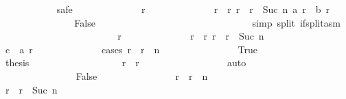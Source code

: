 \begin{isabellebody}
\ \ \ \ \ \ \ \ \ \ \isamarkupfalse%
\ safe\isanewline
\ \ \ \ \ \ \ \ \ \ \ \ \isamarkupfalse%
\ r\isanewline
\ \ \ \ \ \ \ \ \ \ \ \ \isamarkupfalse%
\ {\isachardoublequoteopen}r{}\ {\isacharless}\ r{\isachardoublequoteclose}\ {\isachardoublequoteopen}r\ {\isacharless}\ r{}\ {\isacharplus}\ Suc\ n{\isachardoublequoteclose}\ {\isachardoublequoteopen}{\isacharquery}a\ r\ {\isacharequal}\ {\isacharquery}b\ r{\isachardoublequoteclose}\isanewline
\ \ \ \ \ \ \ \ \ \ \ \ \isamarkupfalse%
\ \isamarkupfalse%
\ False\isanewline
\ \ \ \ \ \ \ \ \ \ \ \ \ \ \isamarkupfalse%
\ {\isacharasterisk}\isanewline
\ \ \ \ \ \ \ \ \ \ \ \ \ \ \isamarkupfalse%
\ {\isacharparenleft}simp\ split{\isacharcolon}\ if{\isacharunderscore}split{\isacharunderscore}asm{\isacharparenright}\isanewline
\ \ \ \ \ \ \ \ \ \ \isamarkupfalse%
\isanewline
\ \ \ \ \ \ \ \ \ \ \ \ \isamarkupfalse%
\ r\isanewline
\ \ \ \ \ \ \ \ \ \ \ \ \isamarkupfalse%
\ {\isachardoublequoteopen}r{}\ {\isacharless}\ r{\isachardoublequoteclose}\ {\isachardoublequoteopen}r\ {\isacharless}\ r{}\ {\isacharplus}\ Suc\ n{\isachardoublequoteclose}\isanewline
\ \ \ \ \ \ \ \ \ \ \ \ \isamarkupfalse%
\ {\isachardoublequoteopen}c{}\ {\isasymle}\ {\isacharquery}a\ r{\isachardoublequoteclose}\isanewline
\ \ \ \ \ \ \ \ \ \ \ \ \isamarkupfalse%
\ {\isacharparenleft}cases\ {\isachardoublequoteopen}r\ {\isacharless}\ r{}\ {\isacharplus}\ n{\isachardoublequoteclose}{\isacharparenright}\isanewline
\ \ \ \ \ \ \ \ \ \ \ \ \ \ \isamarkupfalse%
\ True\isanewline
\ \ \ \ \ \ \ \ \ \ \ \ \ \ \isamarkupfalse%
\ {\isacharquery}thesis\isanewline
\ \ \ \ \ \ \ \ \ \ \ \ \ \ \ \ \isamarkupfalse%
\ {\isacharasterisk}\ {\isacharbackquoteopen}r{}\ {\isacharless}\ r{\isacharbackquoteclose}\isanewline
\ \ \ \ \ \ \ \ \ \ \ \ \ \ \ \ \isamarkupfalse%
\ auto\isanewline
\ \ \ \ \ \ \ \ \ \ \ \ \isamarkupfalse%
\isanewline
\ \ \ \ \ \ \ \ \ \ \ \ \ \ \isamarkupfalse%
\ False\isanewline
\ \ \ \ \ \ \ \ \ \ \ \ \ \ \isamarkupfalse%
\ {\isachardoublequoteopen}r\ {\isacharequal}\ r{}\ {\isacharplus}\ n{\isachardoublequoteclose}\isanewline
\ \ \ \ \ \ \ \ \ \ \ \ \ \ \ \ \isamarkupfalse%
\ {\isacharbackquoteopen}r\ {\isacharless}\ r{}\ {\isacharplus}\ Suc\ n{\isacharbackquoteclose}\isanewline

\end{isabellebody}

